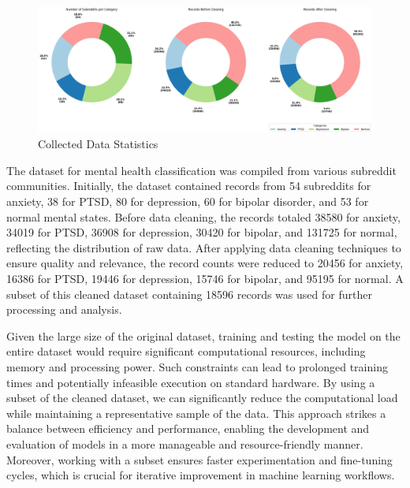 \begin{figure}[h!]  
    \centering
    \includegraphics[width=1.0\textwidth]{Images/Data Collection Graph.png}  
    \caption{Collected Data Statistics}
    \label{LSTMROC7uyiut11}  %
\end{figure}

\noindent
The dataset for mental health classification was compiled from various subreddit communities. Initially, the dataset contained records from 54 subreddits for anxiety, 38 for PTSD, 80 for depression, 60 for bipolar disorder, and 53 for normal mental states. Before data cleaning, the records totaled 38580 for anxiety, 34019 for PTSD, 36908 for depression, 30420 for bipolar, and 131725 for normal, reflecting the distribution of raw data. After applying data cleaning techniques to ensure quality and relevance, the record counts were reduced to 20456 for anxiety, 16386 for PTSD, 19446 for depression, 15746 for bipolar, and 95195 for normal. A subset of this cleaned dataset containing 18596 records was used for further processing and analysis.

\vspace{1em}

\noindent
Given the large size of the original dataset, training and testing the model on the entire dataset would require significant computational resources, including memory and processing power. Such constraints can lead to prolonged training times and potentially infeasible execution on standard hardware. By using a subset of the cleaned dataset, we can significantly reduce the computational load while maintaining a representative sample of the data. This approach strikes a balance between efficiency and performance, enabling the development and evaluation of models in a more manageable and resource-friendly manner. Moreover, working with a subset ensures faster experimentation and fine-tuning cycles, which is crucial for iterative improvement in machine learning workflows.

\pagebreak

